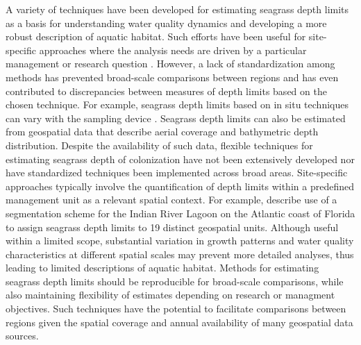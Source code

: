 \documentclass[letterpaper,12pt,oneside]{article}\usepackage[]{graphicx}\usepackage[]{color}
\begin{document}
A variety of techniques have been developed for estimating seagrass depth limits as a basis for understanding water quality dynamics and developing a more robust description of aquatic habitat.  Such efforts have been useful for site-specific approaches where the analysis needs are driven by a particular management or research question \citep[e.g.,][]{Iverson86,Hale04}. However, a lack of standardization among methods has prevented broad-scale comparisons between regions and has even contributed to discrepancies between measures of depth limits based on the chosen technique.  For example, seagrass depth limits based on in situ techniques can vary with the sampling device \citep{Spears09}.  Seagrass depth limits can also be estimated from geospatial data that describe aerial coverage and bathymetric depth distribution.  Despite the availability of such data, flexible techniques for estimating seagrass depth of colonization have not been extensively developed nor have standardized techniques been implemented across broad areas.  Site-specific approaches typically involve the quantification of depth limits within a predefined management unit as a relevant spatial context. For example, \cite{Steward05} describe use of a segmentation scheme for the Indian River Lagoon on the Atlantic coast of Florida to assign seagrass depth limits to 19 distinct geospatial units.  Although useful within a limited scope, substantial variation in growth patterns and water quality characteristics at different spatial scales may prevent more detailed analyses, thus leading to limited descriptions of aquatic habitat.  Methods for estimating seagrass depth limits should be reproducible for broad-scale comparisons, while also maintaining flexibility of  estimates depending on research or managment objectives. Such techniques have the potential to facilitate comparisons between regions given the spatial coverage and annual availability of many geospatial data sources.  
\end{document}
